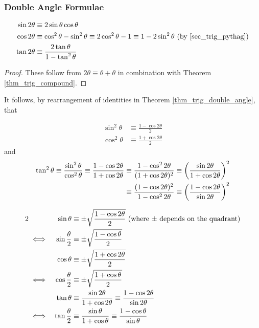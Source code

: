 \subsubsection{Double Angle Formulae} \label{sec_trig_double_angle}
\begin{theorem} \label{thm_trig_double_angle}
\begin{align*}
\sin 2\theta &\equiv
   2\sin \theta \cos \theta \\
\cos 2\theta &\equiv
   \cos^2 \theta - \sin^2 \theta \equiv
   2\cos^2 \theta - 1 \equiv 1 - 2\sin^2 \theta
   \ \text{(by \ref{sec_trig_pythag})} \\
\tan 2\theta &\equiv
    \frac{2\tan \theta}{1 - \tan^2 \theta}
\end{align*}
\end{theorem}
\begin{proof}
These follow from \(2\theta \equiv \theta + \theta\) in combination with
Theorem \ref{thm_trig_compound}.
\end{proof}
It follows, by rearrangement of identities in Theorem
\ref{thm_trig_double_angle}, that
\begin{theorem}
\begin{align*}
\sin^2 \theta &\equiv
    \frac{1 - \cos 2 \theta} 2 \\
\cos^2 \theta &\equiv
    \frac{1 + \cos 2 \theta} 2
\end{align*}
and
\begin{align*}
\tan^2 \theta \equiv \frac{\sin^2 \theta}{\cos^2 \theta}
    \equiv \frac{1 - \cos 2 \theta}{1 + \cos 2 \theta}
    &\equiv \frac{1 - \cos^2 2 \theta}{(1 + \cos 2 \theta)^2}
    \equiv \pqty{\frac{\sin 2 \theta}{1 + \cos 2 \theta}}^2 \\
    &\equiv \frac{(1 - \cos 2 \theta)^2}{1 - \cos^2 2 \theta}
    \equiv \pqty{\frac{1 - \cos 2 \theta}{\sin 2 \theta}}^2
\end{align*}
\end{theorem}
\begin{theorem} \label{thm_trig_half_angle}
\begin{alignat*}2
&&\sin \theta &\equiv
    \pm\sqrt{\frac{1 - \cos 2 \theta} 2}
 \ \pqty{\text{where \(\pm\) depends on the quadrant}} \\
&\iff& \sin \frac \theta 2 &\equiv
    \pm\sqrt{\frac{1 - \cos \theta} 2} \\
&&\cos \theta &\equiv
    \pm\sqrt{\frac{1 + \cos 2 \theta} 2} \\
&\iff& \cos \frac \theta 2 &\equiv
    \pm\sqrt{\frac{1 + \cos \theta} 2} \\
&&\tan \theta &\equiv
    \frac{\sin 2 \theta}{1 + \cos 2 \theta}
    \equiv \frac{1 - \cos 2 \theta}{\sin 2 \theta} \\
&\iff& \tan \frac \theta 2 &\equiv
    \frac{\sin \theta}{1 + \cos \theta}
    \equiv \frac{1 - \cos \theta}{\sin \theta}
\end{alignat*}
\end{theorem}

